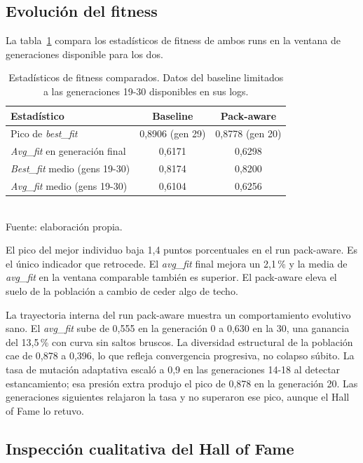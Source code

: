 \subsection{Evolución del fitness}

La tabla~\ref{tab:fitness-ab} compara los estadísticos de fitness de ambos runs en la ventana de generaciones disponible para los dos.

\begin{table}[H]
\centering
\caption{Estadísticos de fitness comparados. Datos del baseline limitados a las generaciones 19-30 disponibles en sus logs.}
\label{tab:fitness-ab}
\begin{tabular}{lcc}
\toprule
\textbf{Estadístico} & \textbf{Baseline} & \textbf{Pack-aware} \\
\midrule
Pico de \emph{best\_fit} & 0,8906 (gen 29) & 0,8778 (gen 20) \\
\emph{Avg\_fit} en generación final & 0,6171 & 0,6298 \\
\emph{Best\_fit} medio (gens 19-30) & 0,8174 & 0,8200 \\
\emph{Avg\_fit} medio (gens 19-30) & 0,6104 & 0,6256 \\
\bottomrule
\end{tabular}
\\[2pt]{\footnotesize Fuente: elaboración propia.}
\end{table}

El pico del mejor individuo baja 1,4 puntos porcentuales en el run pack-aware. Es el único indicador que retrocede. El \emph{avg\_fit} final mejora un 2,1\,\% y la media de \emph{avg\_fit} en la ventana comparable también es superior. El pack-aware eleva el suelo de la población a cambio de ceder algo de techo.

La trayectoria interna del run pack-aware muestra un comportamiento evolutivo sano. El \emph{avg\_fit} sube de 0,555 en la generación 0 a 0,630 en la 30, una ganancia del 13,5\,\% con curva sin saltos bruscos. La diversidad estructural de la población cae de 0,878 a 0,396, lo que refleja convergencia progresiva, no colapso súbito. La tasa de mutación adaptativa escaló a 0,9 en las generaciones 14-18 al detectar estancamiento; esa presión extra produjo el pico de 0,878 en la generación 20. Las generaciones siguientes relajaron la tasa y no superaron ese pico, aunque el Hall of Fame lo retuvo.

\subsection{Inspección cualitativa del Hall of Fame}

